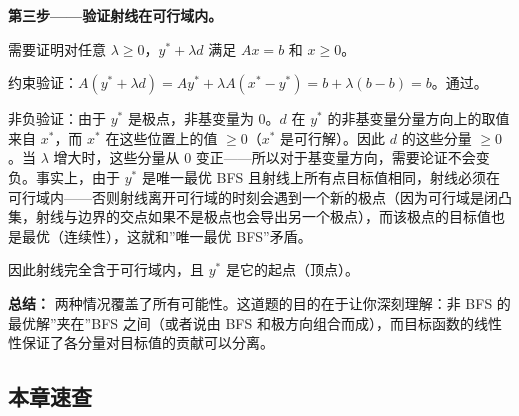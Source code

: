 {\textbf{第三步——验证射线在可行域内。}

需要证明对任意 $\lambda\ge 0$，$y^*+\lambda d$ 满足 $Ax=b$ 和 $x\ge 0$。

约束验证：$A(y^*+\lambda d) = Ay^* + \lambda A(x^*-y^*) = b + \lambda(b-b) = b$。通过。

非负验证：由于 $y^*$ 是极点，非基变量为 0。$d$ 在 $y^*$ 的非基变量分量方向上的取值来自 $x^*$，而 $x^*$ 在这些位置上的值 $\ge 0$（$x^*$ 是可行解）。因此 $d$ 的这些分量 $\ge 0$。当 $\lambda$ 增大时，这些分量从 0 变正——所以对于基变量方向，需要论证不会变负。事实上，由于 $y^*$ 是唯一最优 BFS 且射线上所有点目标值相同，射线必须在可行域内——否则射线离开可行域的时刻会遇到一个新的极点（因为可行域是闭凸集，射线与边界的交点如果不是极点也会导出另一个极点），而该极点的目标值也是最优（连续性），这就和”唯一最优 BFS”矛盾。

因此射线完全含于可行域内，且 $y^*$ 是它的起点（顶点）。

\textbf{总结：} 两种情况覆盖了所有可能性。这道题的目的在于让你深刻理解：非 BFS 的最优解”夹在”BFS 之间（或者说由 BFS 和极方向组合而成），而目标函数的线性性保证了各分量对目标值的贡献可以分离。}

\clearpage\subsection{本章速查}


